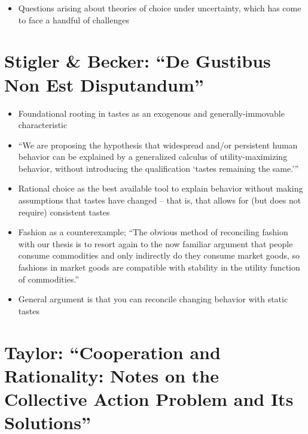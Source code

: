 \documentclass[12pt]{article}
\begin{document}
\begin{itemize}
    \item Questions arising about theories of choice under uncertainty, which has come to face a handful of challenges
\end{itemize}


\section{Stigler \& Becker: ``De Gustibus Non Est Disputandum''}

\begin{itemize}
    \item Foundational rooting in tastes as an exogenous and generally-immovable characteristic
    \item ``We are proposing the hypothesis that widespread and/or persistent human behavior can be explained by a generalized calculus of utility-maximizing behavior, without introducing the qualification `tastes remaining the same.'''
    \item Rational choice as the best available tool to explain behavior without making assumptions that tastes have changed -- that is, that allows for (but does not require) consistent tastes
    \item Fashion as a counterexample; ``The obvious method of reconciling fashion with our thesis is to resort again to the now familiar argument that people consume commodities and only indirectly do they consume market goods, so fashions in market goods are compatible with stability in the utility function of commodities.''
    \item General argument is that you can reconcile changing behavior with static tastes
\end{itemize}


\section{Taylor: ``Cooperation and Rationality: Notes on the Collective Action Problem and Its Solutions''}
\end{document}
